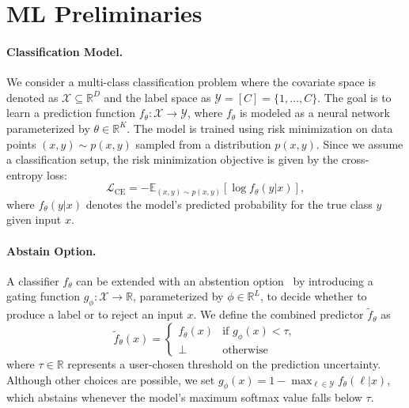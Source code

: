 \section{ML Preliminaries}

\paragraph{Classification Model.} We consider a multi-class classification problem where the covariate space is denoted as \(\mathcal{X} \subseteq \mathbb{R}^D\) and the label space as \(\mathcal{Y} = [C] = \{1, \dots, C\}\). The goal is to learn a prediction function \(f_\theta: \mathcal{X} \to \mathcal{Y}\), where \(f_\theta\) is modeled as a neural network parameterized by \(\theta \in \mathbb{R}^K\). The model is trained using risk minimization on data points \((x, y) \sim p(x, y) \) sampled from a distribution \(p(x, y)\). Since we assume a classification setup, the risk minimization objective is given by the cross-entropy loss:
\begin{equation}
     \mathcal{L}_\text{CE} = - \mathbb{E}_{(x,y) \sim p(x, y)} [\log f_\theta(y | x)],
\end{equation}
where \(f_\theta(y|x)\) denotes the model's predicted probability for the true class $y$ given input \(x\). %

\paragraph{Abstain Option.} A classifier $f_\theta$ can be extended with an abstention option~\citep{el2010foundations} by introducing a gating function \(g_\phi : \mathcal{X} \to \mathbb{R}\), parameterized by \(\phi \in \mathbb{R}^L\), to decide whether to produce a label or to reject an input $x$. We define the combined predictor \(\tilde{f}_\theta\) as
\begin{equation}\label{eq:gating}
\tilde{f}_\theta(x) = 
\begin{cases}
f_\theta(x) & \text{if } g_\phi(x) < \tau,\\
\bot & \text{otherwise}
\end{cases}
\end{equation}
where $\tau \in \mathbb{R}$ represents a user-chosen threshold on the prediction uncertainty. Although other choices are possible, we set \(g_\phi(x) = 1 - \max_{\ell \in \mathcal{Y}} f_\theta(\ell|x)\), which abstains whenever the model’s maximum softmax value falls below \(\tau\).

